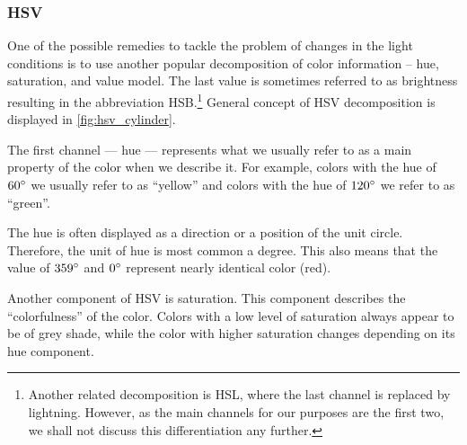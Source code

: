 \subsubsection{HSV}

One of the possible remedies to tackle the problem of changes in the light conditions is to use another popular decomposition of color information -- hue, saturation, and value model. The last value is sometimes referred to as brightness resulting in the abbreviation HSB.\footnote{Another related decomposition is HSL, where the last channel is replaced by lightning. However, as the main channels for our purposes are the first two, we shall not discuss this differentiation any further.} General concept of HSV decomposition is displayed in \autoref{fig:hsv_cylinder}.

The first channel --- hue --- represents what we usually refer to as a main property of the color when we describe it. For example, colors with the hue of $60\degree$ we usually refer to as ``yellow'' and colors with the hue of $120\degree$ we refer to as ``green''.

The hue is often displayed as a direction or a position of the unit circle. Therefore, the unit of hue is most common a degree. This also means that the value of $359\degree$ and $0\degree$ represent nearly identical color (red).



Another component of HSV is saturation. This component describes the ``colorfulness'' of the color. Colors with a low level of saturation always appear to be of grey shade, while the color with higher saturation changes depending on its hue component.

